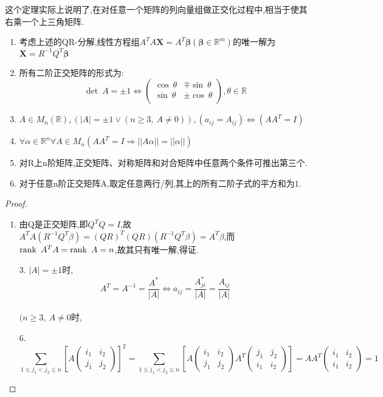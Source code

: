 \documentclass[UTF8,a4paper,notitlepage]{book}
\begin{document}
		这个定理实际上说明了,在对任意一个矩阵的列向量组做正交化过程中,相当于使其右乘一个上三角矩阵.
        \begin{corollary}[正交矩阵的部分性质]\begin{enumerate}\mbox{}
                \item 考虑上述的QR-分解,线性方程组$A^TA\mathbf{X}=A^T\mathbf{\beta}(\mathbf{\beta}\in \mathbb{R}^m)$的唯一解为$\mathbf{X}=R^{-1}Q^T\mathbf{\beta}$
                \item 所有二阶正交矩阵的形式为:$$\det~A=\pm 1\Leftrightarrow \begin{pmatrix}\cos~\theta&\mp \sin~\theta\\ \sin~\theta&\pm \cos~\theta\\ \end{pmatrix},\theta \in \mathbb{R}$$
                \item $A\in M_n(\mathbb{R}),(|A|=\pm 1 \lor (n\geq 3,~A\neq 0)),(a_{ij}=A_{ij})\Leftrightarrow (AA^T=I)$
                \item $\forall \alpha\in\mathbb{R}^n\forall A\in M_n (AA^T=I\Rightarrow ||A\alpha||=||\alpha||)$
                \item 对R上n阶矩阵,正交矩阵、对称矩阵和对合矩阵中任意两个条件可推出第三个.
                \item 对于任意n阶正交矩阵A,取定任意两行/列,其上的所有二阶子式的平方和为1.
        \end{enumerate}\end{corollary}
        \begin{proof}\begin{enumerate}
                \item 由Q是正交矩阵,即$Q^TQ=I$,故$A^TA(R^{-1}Q^T\beta)=(QR)^T(QR)(R^{-1}Q^T\beta)=A^T\beta$,而$\operatorname{rank}~A^TA=\operatorname{rank}~A=n$,故其只有唯一解,得证.
                \item[3.] $|A|=\pm 1$时,$$A^T=A^{-1}=\frac{A^*}{|A|}\Leftrightarrow a_{ij}=\frac{A^*_{ji}}{|A|}=\frac{A_{ij}}{|A|}$$\\ $(n\geq 3,~A\neq 0$时,
                \item[6.] $$\sum_{1\leq j_1<j_2\leq n} \left[A\begin{pmatrix} i_1 & i_2 \\ j_1 & j_2\end{pmatrix}\right]^2=\sum_{1\leq j_1<j_2\leq n}\left[A\begin{pmatrix} i_1 & i_2 \\ j_1 & j_2\end{pmatrix}A^T\begin{pmatrix} j_1 & j_2 \\ i_1 & i_2\end{pmatrix}\right]=AA^T\begin{pmatrix} i_1 & i_2 \\ i_1 & i_2\end{pmatrix}=1$$
        \end{enumerate}\end{proof}
\end{document}
